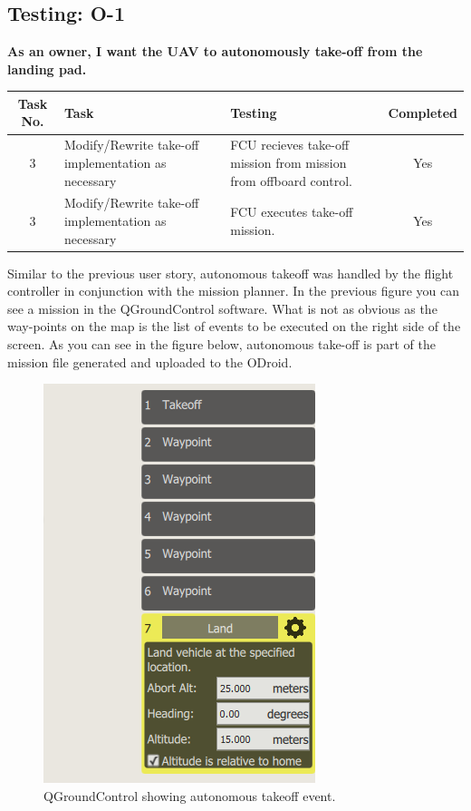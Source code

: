 \subsection{Testing: O-1}
\textbf{As an owner, I want the UAV to autonomously take-off from the landing pad.}\\
\begin{tabular}{| c | >{\raggedright}m{4cm} | m{4cm} | c |}\hline
	Task No. & Task & Testing & Completed\\\hline
	3 & Modify/Rewrite take-off implementation as necessary
 & FCU recieves take-off mission from mission from offboard control. & Yes\\\hline	
	3 & Modify/Rewrite take-off implementation as necessary
 & FCU executes take-off mission. & Yes\\\hline	
\end{tabular}
\vfill
Similar to the previous user story, autonomous takeoff was handled by the flight controller in conjunction with the mission planner. In the previous figure you can see a mission in the QGroundControl software. What is not as obvious as the way-points on the map is the list of events to be executed on the right side of the screen. As you can see in the figure below, autonomous take-off is part of the mission file generated and uploaded to the ODroid.

\begin{figure}[H]
\centering
\includegraphics[height=0.8\textwidth]{images/events.PNG}
\caption{QGroundControl showing autonomous takeoff event.}
\end{figure}

